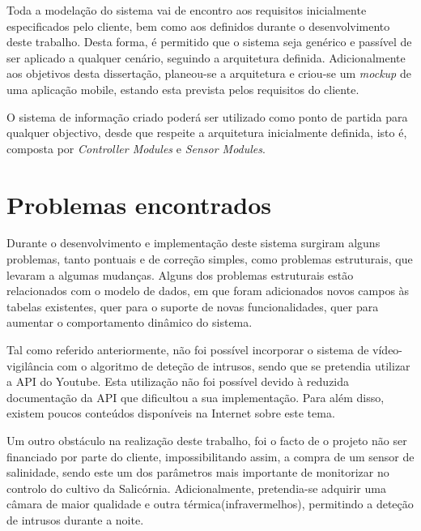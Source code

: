 Toda a modelação do sistema vai de encontro aos requisitos inicialmente especificados pelo cliente, bem como aos definidos durante o desenvolvimento deste trabalho. Desta forma, é permitido que o sistema seja genérico e passível de ser aplicado a qualquer cenário, seguindo a arquitetura definida. Adicionalmente aos objetivos desta dissertação, planeou-se a arquitetura e criou-se um \textit{mockup} de uma aplicação mobile, estando esta prevista pelos requisitos do cliente. 


O sistema de informação criado poderá ser utilizado como ponto de partida para qualquer objectivo, desde que respeite a arquitetura inicialmente definida, isto é, composta por \textit{Controller Modules} e \textit{Sensor Modules}. 



\section{Problemas encontrados}


Durante o desenvolvimento e implementação deste sistema surgiram alguns problemas, tanto pontuais e de correção simples, como
problemas estruturais, que levaram a algumas mudanças. Alguns dos problemas estruturais estão relacionados com o modelo de dados, em que foram adicionados novos campos às tabelas existentes, quer para o suporte de novas funcionalidades, quer para aumentar o comportamento dinâmico do sistema.

Tal como referido anteriormente, não foi possível incorporar o sistema de vídeo-vigilância com o algoritmo de deteção de intrusos, sendo que se pretendia utilizar a \ac{API} do Youtube. Esta utilização não foi possível devido à reduzida documentação da API que dificultou a sua implementação. Para além disso, existem poucos conteúdos disponíveis na Internet sobre este tema. 




Um outro obstáculo na realização deste trabalho, foi o facto de o projeto não ser financiado por parte do cliente, impossibilitando assim, a compra de um sensor de salinidade, sendo este um dos parâmetros mais importante de monitorizar no controlo do cultivo da Salicórnia. Adicionalmente, pretendia-se adquirir uma câmara de maior qualidade e outra térmica(infravermelhos), permitindo a deteção de intrusos durante a noite. 






